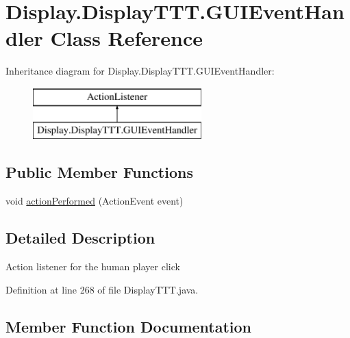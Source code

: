 \hypertarget{class_display_1_1_display_t_t_t_1_1_g_u_i_event_handler}{}\section{Display.\+Display\+T\+T\+T.\+G\+U\+I\+Event\+Handler Class Reference}
\label{class_display_1_1_display_t_t_t_1_1_g_u_i_event_handler}
Inheritance diagram for Display.\+Display\+T\+T\+T.\+G\+U\+I\+Event\+Handler\+:\begin{figure}[H]
\begin{center}
\leavevmode
\includegraphics[height=2.000000cm]{class_display_1_1_display_t_t_t_1_1_g_u_i_event_handler}
\end{center}
\end{figure}
\subsection*{Public Member Functions}
\begin{DoxyCompactItemize}
\item 
void \hyperlink{class_display_1_1_display_t_t_t_1_1_g_u_i_event_handler_a7becbf462a2f5b6fd3159de0abdc37fe}{action\+Performed} (Action\+Event event)
\end{DoxyCompactItemize}


\subsection{Detailed Description}
Action listener for the human player click 

Definition at line 268 of file Display\+T\+T\+T.\+java.



\subsection{Member Function Documentation}
\hypertarget{class_display_1_1_display_t_t_t_1_1_g_u_i_event_handler_a7becbf462a2f5b6fd3159de0abdc37fe}{}
